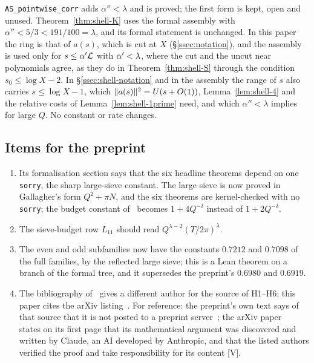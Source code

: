 \begin{enumerate}
\texttt{AS\_pointwise\_corr} adds $\alpha''<\lambda$ and is proved; the first form is kept, open and unused. Theorem~\ref{thm:shell-K}
uses the formal assembly with $\alpha''<5/3<191/100=\lambda$, and its formal statement is unchanged. In this paper the ring is that of $a(s)$, which is cut
at $X$ (\S\ref{ssec:notation}), and the assembly is used only for $s\le\alpha'\mathcal L$ with $\alpha'<\lambda$, where the cut and the uncut near polynomials
agree, as they do in Theorem~\ref{thm:shell-S} through the condition $s_0\le\log X-2$. In \S\ref{ssec:shell-notation} and
in the assembly the range of $s$ also carries $s\le\log X-1$, which $\lVert a(s)\rVert^2=U(s+O(1))$, Lemma~\ref{lem:shell-4} and the
relative costs of Lemma~\ref{lem:shell-1prime} need, and which $\alpha''<\lambda$ implies for large $Q$. No constant or rate changes.
\end{enumerate}

\subsection{\texorpdfstring{Items for the preprint~\cite{DSouza}}{Items for the preprint}}
\begin{enumerate}
\item Its formalisation section says that the six headline theorems depend on one \texttt{sorry}, the sharp large-sieve constant. The large sieve
is now proved in Gallagher's form $Q^2+\pi N$, and the six theorems are kernel-checked with no \texttt{sorry}; the budget constant
of~\cite[Lemma~4.3]{DSouza} becomes $1+4Q^{-\delta}$ instead of $1+2Q^{-\delta}$.
\item The sieve-budget row $L_{11}$ should read $Q^{\lambda-2}(T/2\pi)^\lambda$.
\item The even and odd subfamilies now have the constants $0.7212$ and $0.7098$ of the full families, by the reflected large sieve; this is a Lean theorem on a
branch of the formal tree, and it supersedes the preprint's $0.6980$ and $0.6919$.
\item The bibliography of~\cite{DSouza} gives a different author for the source of H1--H6; this paper cites the arXiv listing~\cite{AF}.
For reference: the preprint's own text says of that source that it is not posted to a preprint server~\cite[\S1.2]{DSouza}; the arXiv paper~\cite{AF}
states on its first page that its mathematical argument was discovered and written by Claude, an AI developed by Anthropic, and that the listed
authors verified the proof and take responsibility for its content [V].
\end{enumerate}
